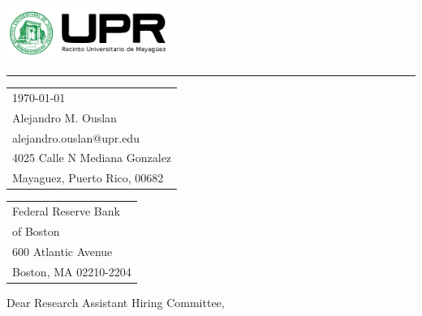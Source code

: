 \documentclass{article}
\begin{document}

\includegraphics[width=0.4\textwidth]{../assets/logo.png} %

\vspace{-1em} %

\rule{\linewidth}{1pt} %

\bigskip\bigskip %


\hfill
\begin{tabular}{l @{}}
\hfill \today \bigskip\\ %
\hfill Alejandro M. Ouslan \\
\hfill alejandro.ouslan@upr.edu \\
\hfill 4025 Calle N Mediana Gonzalez\\
\hfill Mayaguez, Puerto Rico, 00682 \\
\end{tabular}

\bigskip %


\begin{tabular}{@{} l}
Federal Reserve Bank \\ 
of Boston \\
600 Atlantic Avenue \\
Boston, MA 02210-2204\\
\end{tabular}


\bigskip %

Dear Research Assistant Hiring Committee,

\bigskip %
\end{document}
